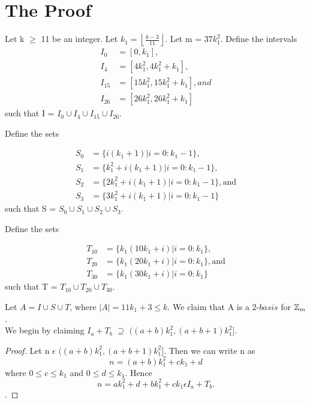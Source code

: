 \section{ The Proof}

Let k $\geq$ 11 be an integer. Let $k_1 = \left \lfloor \frac{k - 3}{11} \right \rfloor$. Let m = $37k_1^2$.  Define the intervals
\begin{align*}
I_0 &= [0, k_1], \\
I_4 &= [4k_1^2, 4k_1^2+k_1], \\
I_{15} &= [15k_1^2, 15k_1^2+k_1], and \\
I_{26} &= [26k_1^2, 26k_1^2+k_1] 
\end{align*}
such that I = $I_0 \cup I_4 \cup I_{15} \cup I_{26}.$

Define the sets

\begin{align*}
S_0 &= \{i(k_1 + 1) | i = 0 : k_1 - 1\},\\
S_1 &= \{k_1^2 + i(k_1 + 1) | i = 0 : k_1 - 1\},\\
S_2 &= \{2k_1^2 + i(k_1 + 1) | i = 0 : k_1 - 1\}, \text{and}\\
S_3 &= \{3k_1^2 + i(k_1 + 1) | i = 0 : k_1 - 1\}
\end{align*}
such that S = $S_0 \cup S_1 \cup S_2 \cup S_3.$

Define the sets

\begin{align*}
T_{10} &= \{k_1(10k_1 + i) | i = 0 : k_1\},\\
T_{20} &= \{k_1(20k_1 + i) | i = 0 : k_1\}, \text{and}\\
T_{30} &= \{k_1(30k_1 + i) | i = 0 : k_1\}
\end{align*}
such that T = $T_{10} \cup T_{20} \cup T_{30} .$

Let $A = I \cup S \cup T$, where $|A| = 11k_1 + 3 \leq k$. We claim that A is a 2-$basis$ for $\mbox{$\mathbb Z$}_m$.
\\ 

We begin by claiming $I_a + T_b$ $\supseteq$ $((a + b)k_1^2 ,  (a + b + 1)k_1^2]$. 
\begin{proof}
Let n $\epsilon$ $((a + b)k_1^2 ,  (a + b + 1)k_1^2]$.
Then we can write n as 
\[
n = (a + b) k_1^2 + ck_1 + d
\]
where $0 \leq c \leq k_1$ and $0 \leq d \leq k_1$. 
Hence 
\[
n = ak_1^2 + d + bk_1^2 + ck_1 \epsilon I_a + T_b.
\].

\end{proof}

